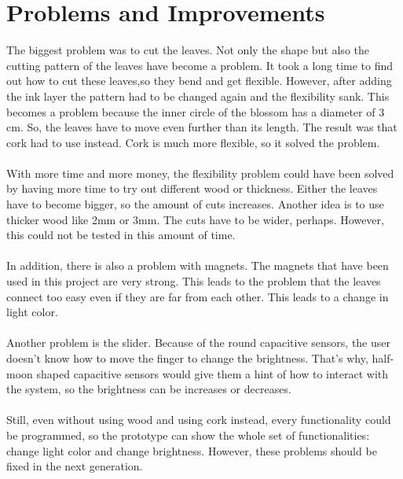 \documentclass[00_doc.tex]{subfiles}
\begin{document}
    \section{Problems and Improvements}
    \begin{flushleft}
        The biggest problem was to cut the leaves. Not only the shape but also the cutting pattern 
        of the leaves have become a problem. It took a long time to find out how to cut these 
        leaves,so they bend and get flexible. However, after adding the ink layer the pattern had 
        to be changed again and the flexibility sank. This becomes a problem because the inner 
        circle of the blossom has a diameter of 3 cm. So, the leaves have to move even further than 
        its length. The result was that cork had to use instead. Cork is much more flexible, so it 
        solved the problem. \\~\\
        
        With more time and more money, the flexibility problem could have been solved by having more 
        time to try out different wood or thickness. Either the leaves have to become bigger, 
        so the amount of cuts increases. Another idea is to use 
        thicker wood like 2mm or 3mm. The cuts have to be wider, perhaps. However, this could not 
        be tested in this amount of time.\\~\\

        In addition, there is also a problem with magnets. The magnets that have been used in this 
        project are very strong. This leads to the problem that the leaves connect too easy even if 
        they are far from each other. This leads to a change in light color.\\~\\

        Another problem is the slider. Because of the round capacitive sensors, the user doesn't
        know how to move the finger to change the brightness. That's why, half-moon shaped capacitive 
        sensors would give them a hint of how to interact with the system, so the brightness can be 
        increases or decreases.\\~\\
        
        Still, even without using wood and using cork instead, every functionality could be 
        programmed, so the prototype can show the whole set of functionalities: change light color 
        and change brightness. However, these problems should be fixed in the next generation.
    \end{flushleft}
\end{document}
